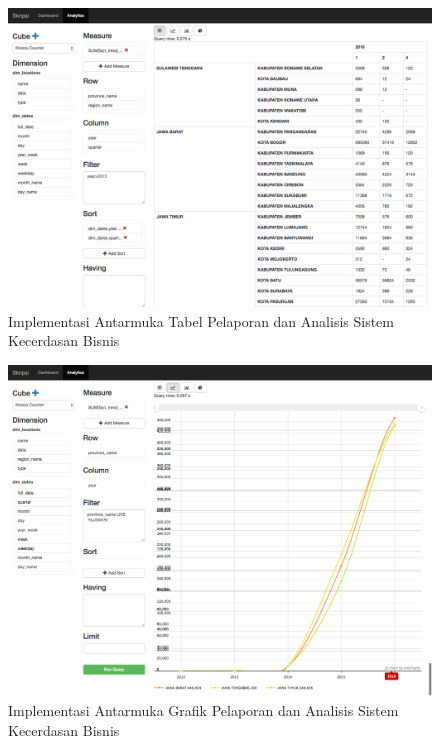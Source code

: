 \begin{figure}[H]
	\centering
	\includegraphics[scale=0.35]{Gambar/ui-implementasi-bi-reporting-01.png}
	\caption[Implementasi Antarmuka Tabel Pelaporan dan Analisis Sistem Kecerdasan Bisnis]{Implementasi Antarmuka Tabel Pelaporan dan Analisis Sistem Kecerdasan Bisnis} 
	\label{fig:ui_implementasi_bi_reporting_1}
\end{figure}

\begin{figure}[H]
	\centering
	\includegraphics[scale=0.35]{Gambar/ui-implementasi-bi-reporting-02.png}
	\caption[Implementasi Antarmuka Grafik Pelaporan dan Analisis Sistem Kecerdasan Bisnis]{Implementasi Antarmuka Grafik Pelaporan dan Analisis Sistem Kecerdasan Bisnis} 
	\label{fig:ui_implementasi_bi_reporting_2}
\end{figure}


